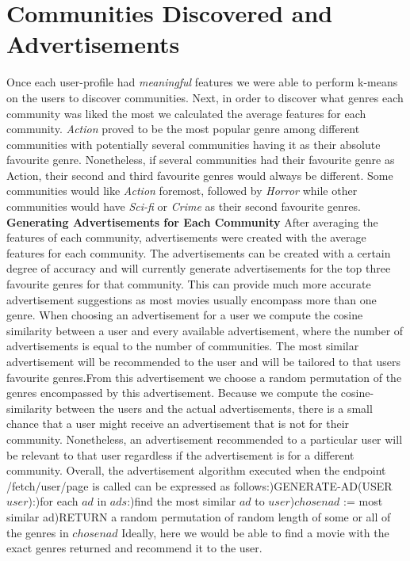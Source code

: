 \documentclass{article}
\newcommand\tab[1][1cm]{\hspace*{#1}}
\begin{document}
\section{Communities Discovered and Advertisements}
Once each user-profile had \textit{meaningful} features we were able to perform k-means on the users to discover communities. Next, in order to discover what genres each community was liked the most we calculated the average features for each community. \textit{Action} proved to be the most popular genre among different communities with potentially several communities having it as their absolute favourite genre. Nonetheless, if several communities had their favourite genre as Action, their second and third favourite genres would always be different. Some communities would like \textit{Action} foremost, followed by \textit{Horror} while other communities would have \textit{Sci-fi} or \textit{Crime} as their second favourite genres.\newline\newline
\textbf{Generating Advertisements for Each Community}\newline
After averaging the features of each community, advertisements were created with the average features for each community. The advertisements can be created with a certain degree of accuracy and will currently generate advertisements for the top three favourite genres for that community. This can provide much more accurate advertisement suggestions as most movies usually encompass more than one genre. When choosing an advertisement for a user we compute the cosine similarity between a user and every available advertisement, where the number of advertisements is equal to the number of communities. The most similar advertisement will be recommended to the user and will be tailored to that users favourite genres.From this advertisement we choose a random permutation of the genres encompassed by this advertisement. Because we compute the cosine-similarity between the users and the actual advertisements, there is a small chance that a user might receive an advertisement that is not for their community. Nonetheless, an advertisement recommended to a particular user will be relevant to that user regardless if the advertisement is for a different community. \newline\newline
Overall, the advertisement algorithm executed when the endpoint  /fetch/{user}/{page} is called can be expressed as follows:)\tab  GENERATE-AD(USER $user$):)\tab\tab for each $ad$ in $ads$:)\tab\tab\tab find the most similar $ad$ to $user$)\tab\tab $chosenad$ := most similar ad)\tab RETURN a random permutation of random length of some or all of the genres in $chosenad$\newline\newline
Ideally, here we would be able to find a movie with the exact genres returned and recommend it to the user. 
\end{document}
